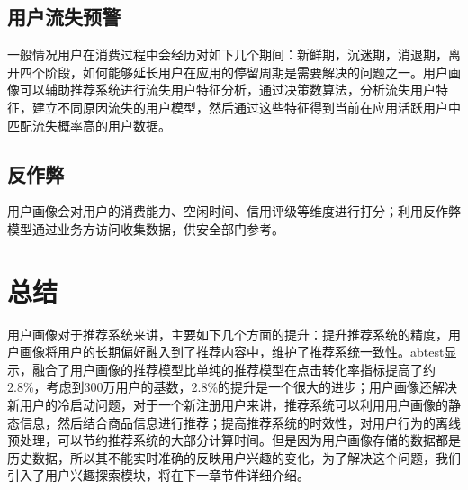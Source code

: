       \subsection{用户流失预警}
      一般情况用户在消费过程中会经历对如下几个期间：新鲜期，沉迷期，消退期，离开四个阶段，如何能够延长用户在应用的停留周期是需要解决的问题之一。用户画像可以辅助推荐系统进行流失用户特征分析，通过决策数算法，分析流失用户特征，建立不同原因流失的用户模型，然后通过这些特征得到当前在应用活跃用户中匹配流失概率高的用户数据。
      \subsection{反作弊}
      用户画像会对用户的消费能力、空闲时间、信用评级等维度进行打分；利用反作弊模型通过业务方访问收集数据，供安全部门参考。
    \section{总结}
      用户画像对于推荐系统来讲，主要如下几个方面的提升：提升推荐系统的精度，用户画像将用户的长期偏好融入到了推荐内容中，维护了推荐系统一致性。abtest显示，融合了用户画像的推荐模型比单纯的推荐模型在点击转化率指标提高了约2.8\%，考虑到300万用户的基数，2.8\%的提升是一个很大的进步；用户画像还解决新用户的冷启动问题，对于一个新注册用户来讲，推荐系统可以利用用户画像的静态信息，然后结合商品信息进行推荐；提高推荐系统的时效性，对用户行为的离线预处理，可以节约推荐系统的大部分计算时间。但是因为用户画像存储的数据都是历史数据，所以其不能实时准确的反映用户兴趣的变化，为了解决这个问题，我们引入了用户兴趣探索模块，将在下一章节件详细介绍。

